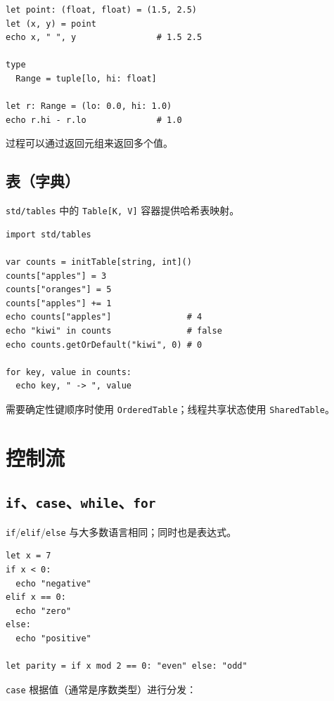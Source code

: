 \documentclass[justified, sixbynine]{tufte-book}
\def\ft{\small\tt}
\theoremstyle{plain}%
\newtheorem * {corollary}{推论}
\theoremstyle{definition}
\theoremstyle{remark}
\newtheorem * {remark}{注记}
\newtheorem * {note}{注释}
\begin{document}
\begin{fullwidth}
\begin{lstlisting}
let point: (float, float) = (1.5, 2.5)
let (x, y) = point
echo x, " ", y                # 1.5 2.5

type
  Range = tuple[lo, hi: float]

let r: Range = (lo: 0.0, hi: 1.0)
echo r.hi - r.lo              # 1.0
\end{lstlisting}

过程可以通过返回元组来返回多个值。

\goodbreak\subsection{表（字典）}


{\ft std/tables} 中的 {\ft Table[K, V]} 容器提供哈希表映射。

\begin{lstlisting}
import std/tables

var counts = initTable[string, int]()
counts["apples"] = 3
counts["oranges"] = 5
counts["apples"] += 1
echo counts["apples"]               # 4
echo "kiwi" in counts               # false
echo counts.getOrDefault("kiwi", 0) # 0

for key, value in counts:
  echo key, " -> ", value
\end{lstlisting}

需要确定性键顺序时使用 {\ft OrderedTable}；线程共享状态使用 {\ft SharedTable}。

\goodbreak\section{控制流}

\goodbreak\subsection{{\ft if}、{\ft case}、{\ft while}、{\ft for}}

{\ft if}/{\ft elif}/{\ft else} 与大多数语言相同；同时也是表达式。

\begin{lstlisting}
let x = 7
if x < 0:
  echo "negative"
elif x == 0:
  echo "zero"
else:
  echo "positive"

let parity = if x mod 2 == 0: "even" else: "odd"
\end{lstlisting}

{\ft case} 根据值（通常是序数类型）进行分发：


\end{fullwidth}
\end{document}
